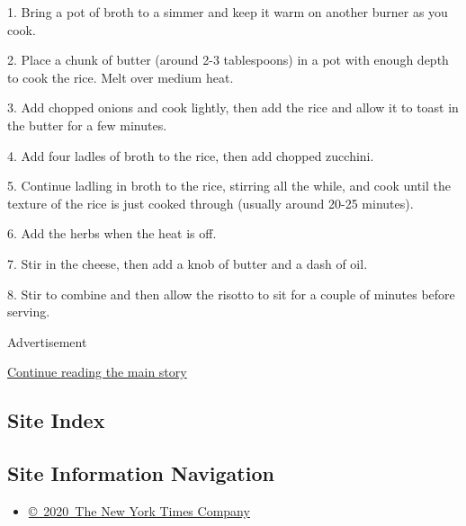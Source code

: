 1. Bring a pot of broth to a simmer and keep it warm on another burner
as you cook.

2. Place a chunk of butter (around 2-3 tablespoons) in a pot with enough
depth to cook the rice. Melt over medium heat.

3. Add chopped onions and cook lightly, then add the rice and allow it
to toast in the butter for a few minutes.

4. Add four ladles of broth to the rice, then add chopped zucchini.

5. Continue ladling in broth to the rice, stirring all the while, and
cook until the texture of the rice is just cooked through (usually
around 20-25 minutes).

6. Add the herbs when the heat is off.

7. Stir in the cheese, then add a knob of butter and a dash of oil.

8. Stir to combine and then allow the risotto to sit for a couple of
minutes before serving.

Advertisement

\protect\hyperlink{after-bottom}{Continue reading the main story}

\hypertarget{site-index}{%
\subsection{Site Index}\label{site-index}}

\hypertarget{site-information-navigation}{%
\subsection{Site Information
Navigation}\label{site-information-navigation}}

\begin{itemize}
\tightlist
\item
  \href{https://help.nytimes.com/hc/en-us/articles/115014792127-Copyright-notice}{©~2020~The
  New York Times Company}
\end{itemize}

